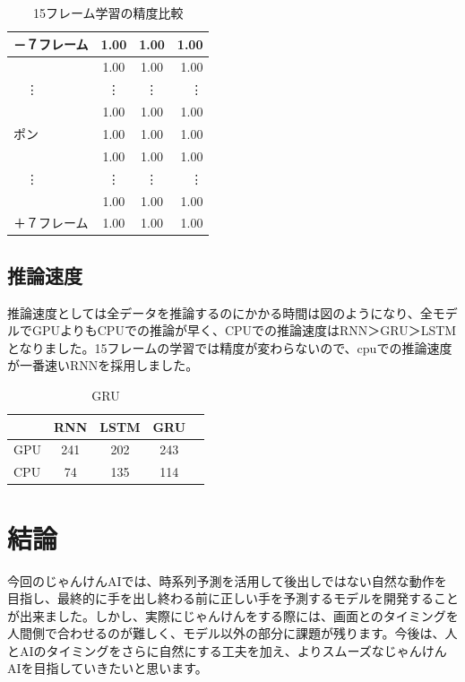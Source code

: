 \begin{table}[h]
\begin{subtable}{0.3\textwidth}
\begin{tabular}{l||c|c|r}
              －７フレーム & 1.00 & 1.00 & 1.00 \\ \hline
               & 1.00 & 1.00 & 1.00 \\ \hline
              　\vdots & \vdots & \vdots & \vdots \\ \hline
               & 1.00 & 1.00 & 1.00 \\ \hline
              ポン & 1.00 & 1.00 & 1.00 \\ \hline
               & 1.00 & 1.00 & 1.00 \\ \hline
              　\vdots & \vdots & \vdots & \vdots \\ \hline
               & 1.00 & 1.00 & 1.00 \\ \hline
               ＋７フレーム& 1.00 & 1.00 & 1.00 \\ \hline
           \end{tabular}
           \caption{15フレーム学習の精度比較}
           \label{tb:15frame}
       \end{subtable}%
   \end{table}

\subsection{推論速度}
推論速度としては全データを推論するのにかかる時間は図のようになり、全モデルでGPUよりもCPUでの推論が早く、CPUでの推論速度はRNN＞GRU＞LSTMとなりました。15フレームの学習では精度が変わらないので、cpuでの推論速度が一番速いRNNを採用しました。
\begin{table}[h]
           \centering
           \begin{tabular}{l||c|c|c|r}
              &RNN&LSTM&GRU\\ \hline\hline
              GPU & 241 & 202 & 243\\ \hline
              CPU & 74 & 135 & 114 \\ \hline
           \end{tabular}
           \caption{GRU}
\end{table}

\section{結論}
今回のじゃんけんAIでは、時系列予測を活用して後出しではない自然な動作を目指し、最終的に手を出し終わる前に正しい手を予測するモデルを開発することが出来ました。しかし、実際にじゃんけんをする際には、画面とのタイミングを人間側で合わせるのが難しく、モデル以外の部分に課題が残ります。今後は、人とAIのタイミングをさらに自然にする工夫を加え、よりスムーズなじゃんけんAIを目指していきたいと思います。

% 